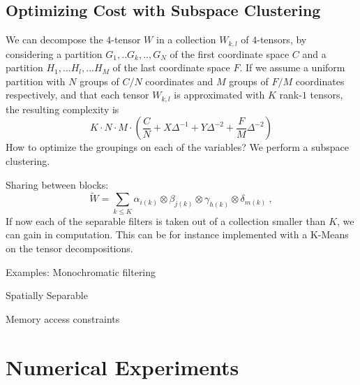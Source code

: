 \documentclass{article}
\begin{document}
\subsection{Optimizing Cost with Subspace Clustering}

We can decompose the $4$-tensor $W$ in a collection $W_{k,l}$ of $4$-tensors, 
by considering a partition $G_1,..G_k,..,G_N$ of the first coordinate space $C$ and
a partition $H_1,...H_l,...H_M$ of the last coordinate space $F$. 
 If we assume a uniform partition with $N$ groups of $C/N$ coordinates and 
 $M$ groups of $F/M$ coordinates respectively, and that each tensor $W_{k,l}$ 
 is approximated with $K$ rank-$1$ tensors, the resulting complexity is 
\begin{equation*}
 K \cdot N \cdot M \cdot \left( \frac{C}{N} + X \Delta^{-1} + Y \Delta^{-2} + \frac{F}{M} \Delta^{-2}\right)
\end{equation*}
 How to optimize the groupings on each of the variables? We perform a subspace clustering. 
 
 
 Sharing between blocks: 
\begin{equation}
\label{rankoptim}
 \widetilde{W} = \sum_{k\leq K} \alpha_{i(k)} \otimes \beta_{j(k)} \otimes \gamma_{h(k)} \otimes \delta_{m(k)}~,
\end{equation}
If now each of the separable filters is taken out of a collection smaller than $K$, we can gain 
in computation. This can be for instance implemented with a K-Means on the tensor decompositions.


Examples:
Monochromatic filtering

Spatially Separable

Memory access constraints


\section{Numerical Experiments}
\end{document}
